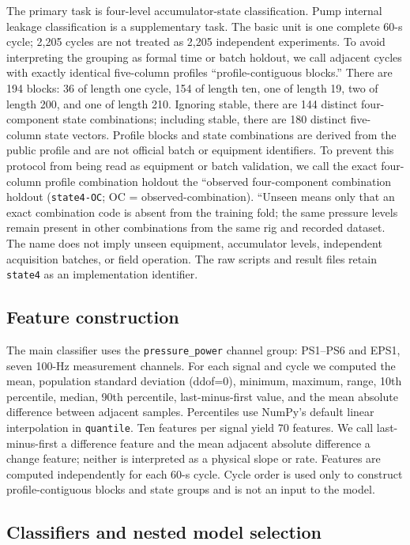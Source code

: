 \documentclass[11pt,a4paper]{article}
\newcommand{\code}[1]{\texttt{#1}}
\begin{document}
The primary task is four-level accumulator-state classification. Pump internal leakage classification is a supplementary task. The basic unit is one complete 60-s cycle; 2,205 cycles are not treated as 2,205 independent experiments. To avoid interpreting the grouping as formal time or batch holdout, we call adjacent cycles with exactly identical five-column profiles ``profile-contiguous blocks.'' There are 194 blocks: 36 of length one cycle, 154 of length ten, one of length 19, two of length 200, and one of length 210. Ignoring stable, there are 144 distinct four-component state combinations; including stable, there are 180 distinct five-column state vectors. Profile blocks and state combinations are derived from the public profile and are not official batch or equipment identifiers.
To prevent this protocol from being read as equipment or batch validation, we call the exact four-column profile combination holdout the ``observed four-component combination holdout (\code{state4-OC}; OC = observed-combination). ``Unseen means only that an exact combination code is absent from the training fold; the same pressure levels remain present in other combinations from the same rig and recorded dataset. The name does not imply unseen equipment, accumulator levels, independent acquisition batches, or field operation. The raw scripts and result files retain \code{state4} as an implementation identifier.

\subsection{Feature construction}

The main classifier uses the \code{pressure\_power} channel group: PS1--PS6 and EPS1, seven 100-Hz measurement channels. For each signal and cycle we computed the mean, population standard deviation (ddof=0), minimum, maximum, range, 10th percentile, median, 90th percentile, last-minus-first value, and the mean absolute difference between adjacent samples. Percentiles use NumPy's default linear interpolation in \code{quantile}. Ten features per signal yield 70 features. We call last-minus-first a difference feature and the mean adjacent absolute difference a change feature; neither is interpreted as a physical slope or rate. Features are computed independently for each 60-s cycle. Cycle order is used only to construct profile-contiguous blocks and state groups and is not an input to the model.

\subsection{Classifiers and nested model selection}
\end{document}
